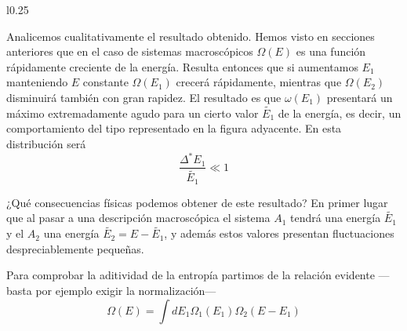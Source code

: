 \begin{wrapfigure}{l}{0.25\textwidth}
	\centering
	\hspace{-2.5cm}
	\vspace{-0.5cm}
\end{wrapfigure}



Analicemos cualitativamente el resultado obtenido.
Hemos visto en secciones anteriores que en el caso de sistemas macroscópicos $\Omega(E)$ es una función rápidamente creciente de la energía.
Resulta entonces que si aumentamos $E_1$ manteniendo $E$ constante $\Omega(E_1)$ crecerá rápidamente, mientras que $\Omega(E_2)$ disminuirá también con gran rapidez.
El resultado es que $\omega(E_1)$ presentará un máximo extremadamente agudo para un cierto valor $\widetilde{E_1}$ de la energía, es decir, un comportamiento del tipo representado en la figura adyacente.
En esta distribución será
$$\frac{\Delta^* E_1}{\widetilde{E_1}} \ll 1$$

¿Qué consecuencias físicas podemos obtener de este resultado? En primer lugar que al pasar a una descripción macroscópica el sistema $A_1$ tendrá una energía $\widetilde{E_1}$ y el $A_2$ una energía $\widetilde{E_2} = E-\widetilde{E_1}$, y además estos valores presentan fluctuaciones despreciablemente pequeñas.

Para comprobar la aditividad de la entropía partimos de la relación evidente ---basta por ejemplo exigir la normalización---
\begin{equation}
	\Omega(E) = \int dE_1 \Omega_1(E_1) \Omega_2(E - E_1)
\end{equation}

